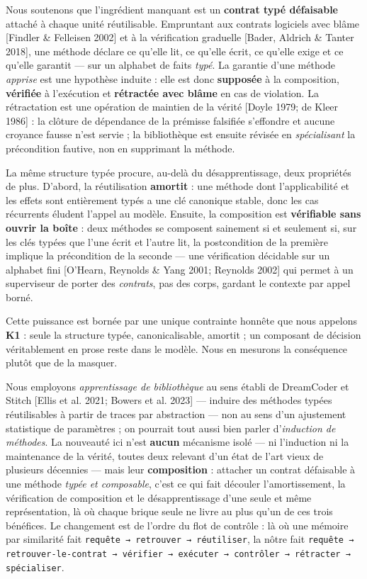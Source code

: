 \documentclass[11pt]{article}
\begin{document}
Nous soutenons que l'ingrédient manquant est un \textbf{contrat typé défaisable} attaché à chaque unité réutilisable. Empruntant aux contrats logiciels avec blâme [Findler \& Felleisen 2002] et à la vérification graduelle [Bader, Aldrich \& Tanter 2018], une méthode déclare ce qu'elle lit, ce qu'elle écrit, ce qu'elle exige et ce qu'elle garantit — sur un alphabet de faits \emph{typé}. La garantie d'une méthode \emph{apprise} est une hypothèse induite : elle est donc \textbf{supposée} à la composition, \textbf{vérifiée} à l'exécution et \textbf{rétractée avec blâme} en cas de violation. La rétractation est une opération de maintien de la vérité [Doyle 1979; de Kleer 1986] : la clôture de dépendance de la prémisse falsifiée s'effondre et aucune croyance fausse n'est servie ; la bibliothèque est ensuite révisée en \emph{spécialisant} la précondition fautive, non en supprimant la méthode.

La même structure typée procure, au-delà du désapprentissage, deux propriétés de plus. D'abord, la réutilisation \textbf{amortit} : une méthode dont l'applicabilité et les effets sont entièrement typés a une clé canonique stable, donc les cas récurrents éludent l'appel au modèle. Ensuite, la composition est \textbf{vérifiable sans ouvrir la boîte} : deux méthodes se composent sainement si et seulement si, sur les clés typées que l'une écrit et l'autre lit, la postcondition de la première implique la précondition de la seconde — une vérification décidable sur un alphabet fini [O'Hearn, Reynolds \& Yang 2001; Reynolds 2002] qui permet à un superviseur de porter des \emph{contrats}, pas des corps, gardant le contexte par appel borné.

Cette puissance est bornée par une unique contrainte honnête que nous appelons \textbf{K1} : seule la structure typée, canonicalisable, amortit ; un composant de décision véritablement en prose reste dans le modèle. Nous en mesurons la conséquence plutôt que de la masquer.

Nous employons \emph{apprentissage de bibliothèque} au sens établi de DreamCoder et Stitch [Ellis et al. 2021; Bowers et al. 2023] — induire des méthodes typées réutilisables à partir de traces par abstraction — non au sens d'un ajustement statistique de paramètres ; on pourrait tout aussi bien parler d'\emph{induction de méthodes}. La nouveauté ici n'est \textbf{aucun} mécanisme isolé — ni l'induction ni la maintenance de la vérité, toutes deux relevant d'un état de l'art vieux de plusieurs décennies — mais leur \textbf{composition} : attacher un contrat défaisable à une méthode \emph{typée et composable}, c'est ce qui fait découler l'amortissement, la vérification de composition et le désapprentissage d'une seule et même représentation, là où chaque brique seule ne livre au plus qu'un de ces trois bénéfices. Le changement est de l'ordre du flot de contrôle : là où une mémoire par similarité fait \texttt{requête → retrouver → réutiliser}, la nôtre fait \texttt{requête → retrouver-le-contrat → vérifier → exécuter → contrôler → rétracter → spécialiser}.
\end{document}
